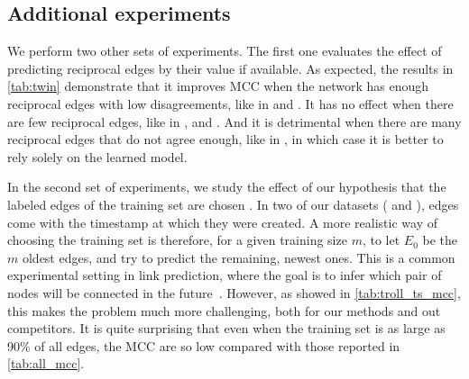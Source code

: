 \begin{newcontent}
\subsection{Additional experiments}
  
We perform two other sets of experiments. The first one evaluates the effect of predicting reciprocal
edges by their value if available. As expected, the results in \autoref{tab:twin} demonstrate that
it improves MCC when the network has enough reciprocal edges with low disagreements, like in \sla{} and
\epi{}. It has no effect when there are few reciprocal edges, like in \aut{}, \wik{} and \kiw{}. And it is
detrimental when there are many reciprocal edges that do not agree enough, like in \adv{}, in which
case it is better to rely solely on the learned model.



In the second set of experiments, we study the effect of our hypothesis that the labeled edges of the training set are
chosen \uar{}. In two of our datasets (\wik{} and \epi{}), edges come with the timestamp at which they
were created. A more realistic way of choosing the training set is therefore, for a given training
size $m$, to let $E_0$ be the $m$ oldest edges, and try to predict the remaining, newest ones. This
is a common experimental setting in link prediction, where the goal is to infer which pair of nodes
will be connected in the future~\autocite{linkPredSurvey16}. However, as showed in
\autoref{tab:troll_ts_mcc}, this makes the problem much more challenging, both for our methods and
out competitors. It is quite surprising that even when the training set is as large as 90\% of all
edges, the MCC are so low compared with those reported in \autoref{tab:all_mcc}.




\end{newcontent}
